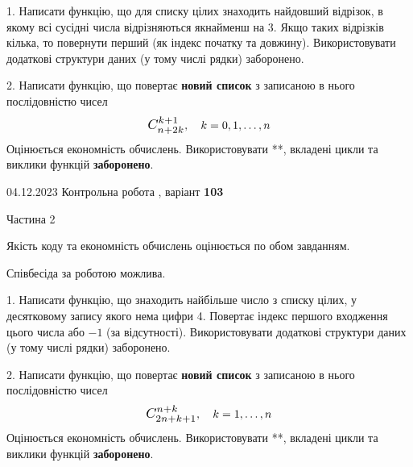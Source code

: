 \documentclass[12pt, ukrainian]{article}
\begin{document}
{{\begin {Large}
1. Написати функцію, що для списку цілих знаходить найдовший відрізок, в якому всі сусідні числа відрізняються якнайменш на 3. Якщо таких відрізків кілька, то повернути перший (як індекс початку та довжину). Використовувати додаткові структури даних (у тому числі рядки) заборонено.

\vspace{10mm}



2. 
Написати функцію, що повертає \textbf{новий список} з записаною в нього послідовністю чисел
$$\scalebox{1.2}{$C_{n+2k}^{k+1}$}, \quad k=0,1,\ldots,n$$
Оцінюється економність обчислень. Використовувати **, вкладені цикли та виклики функцій \textbf{заборонено}.

\end{Large}\newpage




\begin {Huge}
{{04.12.2023 Контрольна робота , варіант  \No \textbf { 103 }\par}}

\begin{center}Частина 2
\end{center}
\vspace{10mm}
\end {Huge}

{
\begin {Large}
Якість коду та економність обчислень оцінюється по обом завданням.

Співбесіда за роботою можлива.

\vspace{5mm}

1. Написати функцію, що знаходить найбільше число з списку цілих, у десятковому запису якого нема цифри 4. Повертає індекс першого входження цього числа або $-1$ (за відсутності). Використовувати додаткові структури даних (у тому числі рядки) заборонено.

\vspace{10mm}



2. 
Написати функцію, що повертає \textbf{новий список} з записаною в нього послідовністю чисел
$$\scalebox{1.2}{$C_{2n+k+1}^{n+k}$}, \quad k=1,\ldots,n$$
Оцінюється економність обчислень. Використовувати **, вкладені цикли та виклики функцій \textbf{заборонено}.

\end{Large}\newpage

}}}
\end{document}
